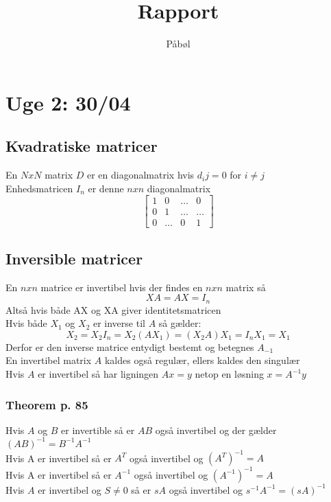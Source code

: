 \documentclass[a4paper,fleqn]{report}
\title{Rapport}
\author{P\aa b\o l}
\begin{document}
	\maketitle
	\setcounter{page}{1}
	\chapter{Uge 2: 30/04}
	\section{Kvadratiske matricer}
	En $NxN$ matrix $D$ er en diagonalmatrix hvis $d_ij = 0$ for $i \neq j$\\

	Enhedsmatricen $I_n$ er denne $nxn$ diagonalmatrix
	\[\begin{bmatrix}1&0&\dots&0\\0&1&\dots&\dots\\0&\dots&0&1\end{bmatrix}\]

	\section{Inversible matricer}
	En $n x n$ matrice er invertibel hvis der findes en $n x n$ matrix så \[XA = AX = I_n\]
	Altså hvis både AX og XA giver identitetsmatricen\\
	Hvis både $X_1$ og $X_2$ er inverse til $A$ så gælder: 
	\[X_2 = X_2I_n = X_2(AX_1) = (X_2A)X_1 = I_nX_1 = X_1\]
	Derfor er den inverse matrice entydigt bestemt og betegnes $A_{-1}$\\
	En invertibel matrix $A$ kaldes også regulær, ellers kaldes den singulær\\
	Hvis $A$ er invertibel så har ligningen $Ax = y$ netop en løsning $x = A^{-1}y$\\

	\subsection{Theorem p. 85}
	Hvis $A$ og $B$ er invertible så er $AB$ også invertibel og der gælder $(AB)^{-1} = B^{-1}
	A^{-1}$\\
	Hvis A er invertibel så er $A^T$ også invertibel og $(A^T)^{-1} = A$\\
	Hvis A er invertibel så er $A^{-1}$ også invertibel og $(A^{-1})^{-1} = A$\\
	Hvis $A$ er invertibel og $S \neq 0$ så er $sA$ også invertibel og $s^{-1}A^{-1}=(sA)^{-1}$
\end{document}
